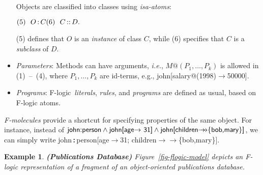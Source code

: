 \documentclass[11pt]{article}
\newtheorem{example}{Example}[section]
\newcommand{\isa}{\,{\bf{:}}\,}
\newcommand{\subcl}{\,{\bf{::}}\,}
\newcommand{\fd}{\ensuremath{{\rightarrow}}}                   %
\newcommand{\mvd}{\ensuremath{{\rightarrow\!\!\!\!\rightarrow}}}  %
\newcommand{\fl}{{F-logic}\xspace}
\begin{document}
\begin{itemize}
  Objects are classified into classes using
  \emph{isa-atoms}: \medskip

  \begin{math}
    \hfill (5)~~O\isa C \hfill (6)~~C\subcl D. \hfill
  \end{math} \medskip

  (5) defines that $O$ is an \emph{instance} of class $C$, while (6)
  specifies that $C$ is a \emph{subclass} of $D$. 
\item \emph{Parameters}: Methods can have arguments, {\it i.e.}, 
  \begin{math}
    M@(P_1,\dots,P_k)
  \end{math}
  is allowed in (1)~--~(4), where $P_1,\dots,P_k$ are
  id-terms, e.g., \textsf{john[salary@(1998)\fd 50000]}.
  
\item \emph{Programs}: \fl\ \emph{literals}, \emph{rules}, and
  \emph{programs} are defined as usual, based on \fl atoms.
\end{itemize}

\noindent
{}
\emph{F-molecules} provide a shortcut for specifying properties of the same
object. For instance, instead of
$\textsf{john:person}\land\textsf{john[age\fd
  31]}\land\textsf{john[children\mvd\{bob,mary\}]}$, we can simply write
\textsf{john\isa person[age\fd 31; children\mvd\{bob,mary\}]}.


\begin{example}
  {\bf (Publications Database)} \rm Figure~\ref{fig-flogic-model} depicts
  an \fl representation of a fragment of an object-oriented publications
  database.
\end{example}
\end{document}
